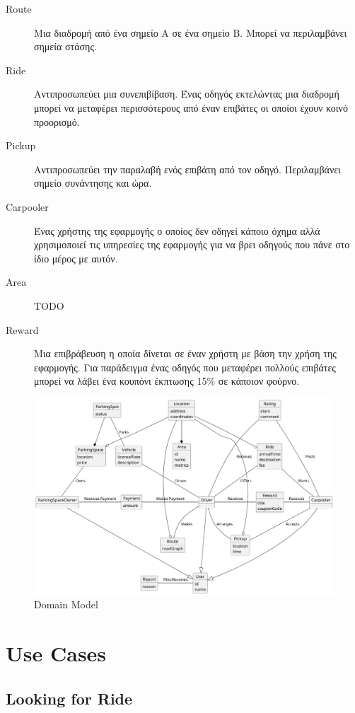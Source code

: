 \documentclass[11pt]{article}
\begin{document}
\begin{description}
    \item[Route]
        Μια διαδρομή από ένα σημείο Α σε ένα σημείο Β. Μπορεί να περιλαμβάνει
        σημεία στάσης.
    \item[Ride]
        Αντιπροσωπεύει μια συνεπιβίβαση. Ένας οδηγός εκτελώντας μια διαδρομή
        μπορεί να μεταφέρει περισσότερους από έναν επιβάτες οι οποίοι έχουν
        κοινό προορισμό.
    \item[Pickup]
        Αντιπροσωπεύει την παραλαβή ενός επιβάτη από τον οδηγό. Περιλαμβάνει
        σημείο συνάντησης και ώρα.
    \item[Carpooler]
        Ένας χρήστης της εφαρμογής ο οποίος δεν οδηγεί κάποιο όχημα αλλά
        χρησιμοποιεί τις υπηρεσίες της εφαρμογής για να βρει οδηγούς που πάνε
        στο ίδιο μέρος με αυτόν.
    \item[Area]
        TODO
    \item[Reward]
        Μια επιβράβευση η οποία δίνεται σε έναν χρήστη με βάση την χρήση της
        εφαρμογής. Για παράδειγμα ένας οδηγός που μεταφέρει πολλούς επιβάτες
        μπορεί να λάβει ένα κουπόνι έκπτωσης 15\% σε κάποιον φούρνο.
\end{description}

\begin{figure}
    \centering
    \includegraphics[width=\textwidth]{domain-model}
    \caption{Domain Model}
\end{figure}

\newpage

\section{Use Cases}

\subsection{Looking for Ride}
\end{document}
